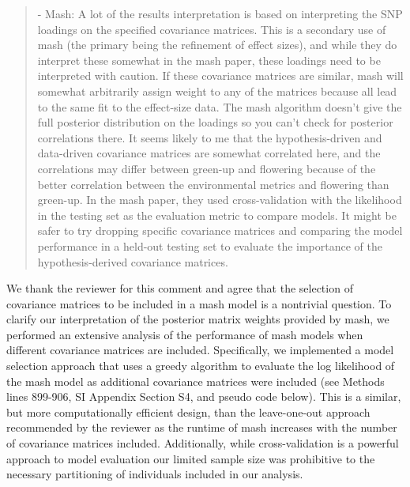 \documentclass[
  letterpaper,
  DIV=11,
  numbers=noendperiod]{scrartcl}
\begin{document}
\begin{quote}
\begin{tcolorbox}[enhanced jigsaw, colframe=quarto-callout-warning-color-frame, rightrule=.15mm, leftrule=.75mm, left=2mm, breakable, toprule=.15mm, arc=.35mm, bottomrule=.15mm, opacityback=0, colback=white]

- Mash: A lot of the results interpretation is based on interpreting the
SNP loadings on the specified covariance matrices. This is a secondary
use of mash (the primary being the refinement of effect sizes), and
while they do interpret these somewhat in the mash paper, these loadings
need to be interpreted with caution. If these covariance matrices are
similar, mash will somewhat arbitrarily assign weight to any of the
matrices because all lead to the same fit to the effect-size data. The
mash algorithm doesn't give the full posterior distribution on the
loadings so you can't check for posterior correlations there. It seems
likely to me that the hypothesis-driven and data-driven covariance
matrices are somewhat correlated here, and the correlations may differ
between green-up and flowering because of the better correlation between
the environmental metrics and flowering than green-up. In the mash
paper, they used cross-validation with the likelihood in the testing set
as the evaluation metric to compare models. It might be safer to try
dropping specific covariance matrices and comparing the model
performance in a held-out testing set to evaluate the importance of the
hypothesis-derived covariance matrices.

\end{tcolorbox}
\end{quote}

We thank the reviewer for this comment and agree that the selection of
covariance matrices to be included in a mash model is a nontrivial
question. To clarify our interpretation of the posterior matrix weights
provided by mash, we performed an extensive analysis of the performance
of mash models when different covariance matrices are included.
Specifically, we implemented a model selection approach that uses a
greedy algorithm to evaluate the log likelihood of the mash model as
additional covariance matrices were included (see Methods lines 899-906,
SI Appendix Section S4, and pseudo code below). This is a similar, but
more computationally efficient design, than the leave-one-out approach
recommended by the reviewer as the runtime of mash increases with the
number of covariance matrices included. Additionally, while
cross-validation is a powerful approach to model evaluation our limited
sample size was prohibitive to the necessary partitioning of individuals
included in our analysis.
\end{document}
